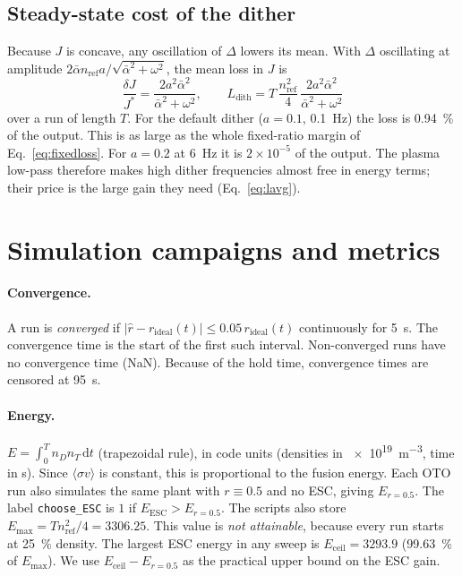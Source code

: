 \documentclass[11pt,a4paper]{article}
\newcommand{\nD}{n_D}
\newcommand{\nT}{n_T}
\newcommand{\nref}{n_\mathrm{ref}}
\newcommand{\rid}{r_\mathrm{ideal}}
\newcommand{\rhat}{\hat r}
\begin{document}
\subsection{Steady-state cost of the dither}
\label{sec:ditherloss}
Because $J$ is concave, any oscillation of $\Delta$ lowers its mean. With $\Delta$ oscillating at amplitude $2\bar\alpha\nref a/\sqrt{\bar\alpha^2+\omega^2}$, the mean loss in $J$ is
\begin{equation}
  \frac{\delta J}{J^\ast} = \frac{2a^2\bar\alpha^2}{\bar\alpha^2+\omega^2},\qquad
  L_\mathrm{dith} = T\,\frac{\nref^2}{4}\,\frac{2a^2\bar\alpha^2}{\bar\alpha^2+\omega^2}
  \label{eq:ditherloss}
\end{equation}
over a run of length $T$. For the default dither ($a=0.1$, \SI{0.1}{Hz}) the loss is \SI{0.94}{\percent} of the output. This is as large as the whole fixed-ratio margin of Eq.~\eqref{eq:fixedloss}. For $a=0.2$ at \SI{6}{Hz} it is $2\times10^{-5}$ of the output. The plasma low-pass therefore makes high dither frequencies almost free in energy terms; their price is the large gain they need (Eq.~\eqref{eq:lavg}).

\section{Simulation campaigns and metrics}
\label{sec:setup}

\paragraph{Convergence.} A run is \emph{converged} if $|\rhat-\rid(t)|\le0.05\,\rid(t)$ continuously for \SI{5}{s}. The convergence time is the start of the first such interval. Non-converged runs have no convergence time (NaN). Because of the hold time, convergence times are censored at \SI{95}{s}.

\paragraph{Energy.} $E=\int_0^{T}\nD\nT\,\mathrm{d}t$ (trapezoidal rule), in code units (densities in \SI{e19}{m^{-3}}, time in s). Since $\langle\sigma v\rangle$ is constant, this is proportional to the fusion energy. Each OTO run also simulates the same plant with $r\equiv0.5$ and no ESC, giving $E_{r=0.5}$. The label \texttt{choose\_ESC} is $1$ if $E_\mathrm{ESC}>E_{r=0.5}$.
The scripts also store $E_\mathrm{max}=T\nref^2/4=3306.25$. This value is \emph{not attainable}, because every run starts at \SI{25}{\percent} density. The largest ESC energy in any sweep is $E_\mathrm{ceil}=3293.9$ (\SI{99.63}{\percent} of $E_\mathrm{max}$). We use $E_\mathrm{ceil}-E_{r=0.5}$ as the practical upper bound on the ESC gain.
\end{document}
